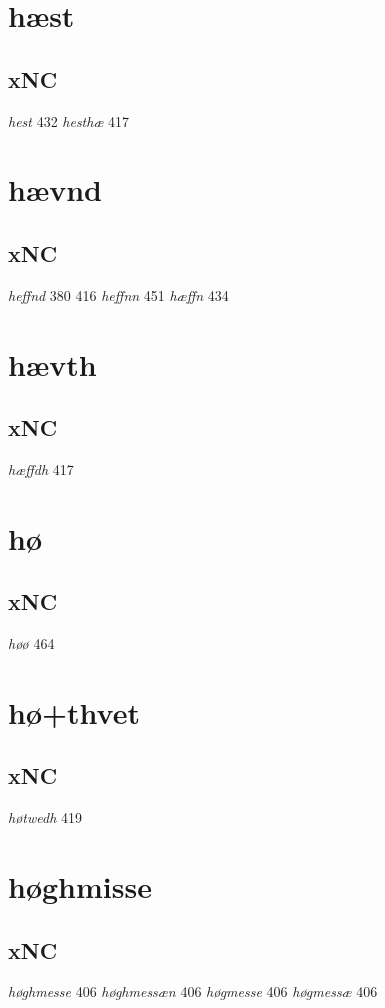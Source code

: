 \documentclass[a4paper,twocolumn]{article}
\begin{document}
\section{hæst}
\label{sec:org0ebfbff}
\subsection{xNC}
\label{sec:orgb80c128}
\emph{hest} 432 \emph{hesthæ} 417 
\section{hævnd}
\label{sec:org72a2c43}
\subsection{xNC}
\label{sec:orgf858ad5}
\emph{heffnd} 380 416 \emph{heffnn} 451 \emph{hæffn} 434 
\section{hævth}
\label{sec:orgd3c56d4}
\subsection{xNC}
\label{sec:org189e3f6}
\emph{hæffdh} 417 
\section{hø}
\label{sec:org94808a7}
\subsection{xNC}
\label{sec:org7f76414}
\emph{høø} 464 
\section{hø+thvet}
\label{sec:org74b9f80}
\subsection{xNC}
\label{sec:org3c76c5e}
\emph{høtwedh} 419 
\section{høghmisse}
\label{sec:org56c590b}
\subsection{xNC}
\label{sec:orgc9800b0}
\emph{høghmesse} 406 \emph{høghmessæn} 406 \emph{høgmesse} 406 \emph{høgmessæ} 406 
\end{document}
